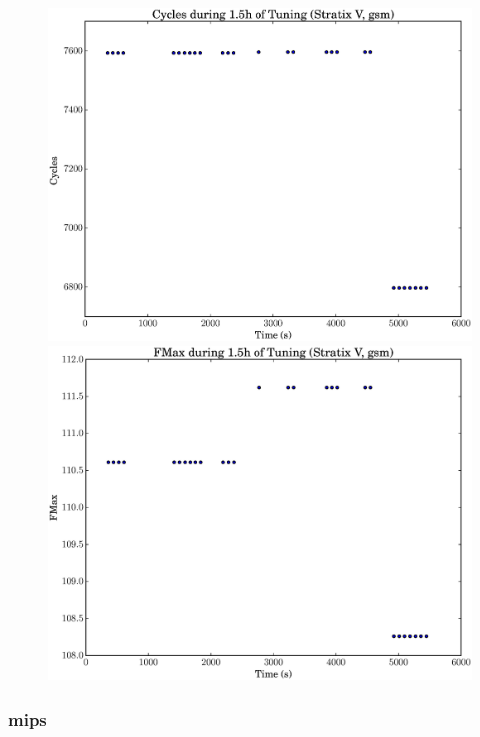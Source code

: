 \documentclass[12pt, a4paper]{article}
\begin{document}
\begin{figure}[htpb]
    \begin{minipage}{.48\textwidth}
        \includegraphics[scale=.25]{gsm_cycles_5400_chstone_StratixV}
    \end{minipage}%
    \hfill
    \begin{minipage}{.48\textwidth}
        \includegraphics[scale=.25]{gsm_fmax_5400_chstone_StratixV}
    \end{minipage}%
\end{figure}

\newpage

\subsubsection{mips}
\end{document}
